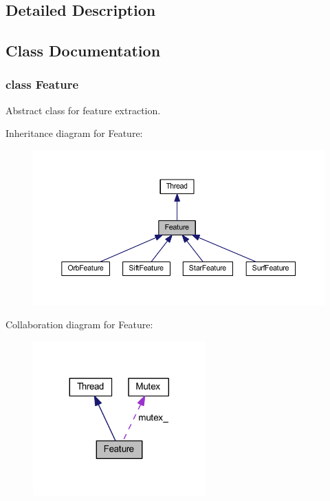 \subsection{Detailed Description}


\subsection{Class Documentation}
\label{class_feature}
\hypertarget{group___feature_extractor_class_feature}{}
\subsubsection{class Feature}
Abstract class for feature extraction. 

Inheritance diagram for Feature\-:\nopagebreak
\begin{figure}[H]
\begin{center}
\leavevmode
\includegraphics[width=350pt]{class_feature__inherit__graph}
\end{center}
\end{figure}


Collaboration diagram for Feature\-:\nopagebreak
\begin{figure}[H]
\begin{center}
\leavevmode
\includegraphics[width=188pt]{class_feature__coll__graph}
\end{center}
\end{figure}
